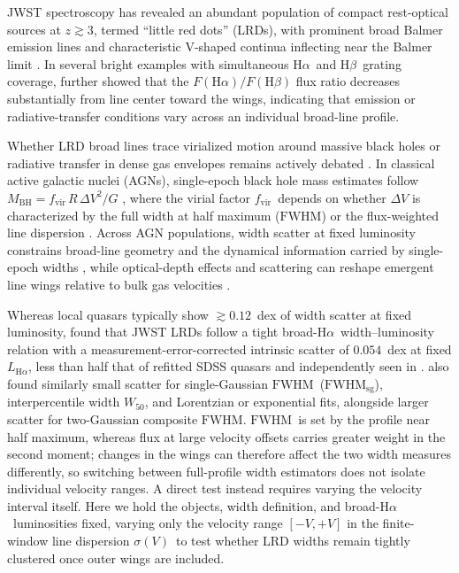\documentclass[twocolumn]{aastex631}
\newcommand{\Ha}{\ensuremath{\mathrm{H}\alpha}}
\newcommand{\Hb}{\ensuremath{\mathrm{H}\beta}}
\newcommand{\LHa}{\ensuremath{L_{\mathrm{H}\alpha}}}
\newcommand{\FWHM}{\ensuremath{\mathrm{FWHM}}}
\newcommand{\FWHMsg}{\ensuremath{\mathrm{FWHM}_{\mathrm{sg}}}}
\newcommand{\fvir}{\ensuremath{f_{\mathrm{vir}}}}
\newcommand{\MBH}{\ensuremath{M_{\mathrm{BH}}}}
\newcommand{\sigV}{\ensuremath{\sigma(V)}}
\begin{document}
JWST spectroscopy has revealed an abundant population of compact rest-optical sources at $z \gtrsim 3$, termed ``little red dots'' (LRDs), with prominent broad Balmer emission lines \citep{Matthee2024,Greene2024} and characteristic V-shaped continua inflecting near the Balmer limit \citep{Setton2025Vshape}. In several bright examples with simultaneous \Ha\ and \Hb\ grating coverage, \citet[][Section~V.3.1 and Figure~9]{Chen2026} further showed that the $F(\Ha)/F(\Hb)$ flux ratio decreases substantially from line center toward the wings, indicating that emission or radiative-transfer conditions vary across an individual broad-line profile.

Whether LRD broad lines trace virialized motion around massive black holes or radiative transfer in dense gas envelopes remains actively debated \citep[e.g.,][]{Rusakov2026,Madau2026b,InayoshiHo}. In classical active galactic nuclei (AGNs), single-epoch black hole mass estimates follow $\MBH = \fvir\, R\, \Delta V^2 / G$ \citep{Peterson2004,GreeneHo2005,Bentz2013}, where the virial factor \fvir\ depends on whether $\Delta V$ is characterized by the full width at half maximum (\FWHM) or the flux-weighted line dispersion \citep{Collin2006}. Across AGN populations, width scatter at fixed luminosity constrains broad-line geometry and the dynamical information carried by single-epoch widths \citep{Fine2008,Croom2011,Assef2012}, while optical-depth effects and scattering can reshape emergent line wings relative to bulk gas velocities \citep{OsterbrockFerland2006,Laor2006}.

Whereas local quasars typically show $\gtrsim 0.12$~dex of width scatter at fixed luminosity, \citet{Wang2026} found that JWST LRDs follow a tight broad-\Ha\ width--luminosity relation with a measurement-error-corrected intrinsic scatter of $0.054$~dex at fixed \LHa, less than half that of refitted SDSS quasars and independently seen in \citet{BaccusXu2026}. \citet{Wang2026} also found similarly small scatter for single-Gaussian \FWHM\ (\FWHMsg), interpercentile width $W_{50}$, and Lorentzian or exponential fits, alongside larger scatter for two-Gaussian composite \FWHM. \FWHM\ is set by the profile near half maximum, whereas flux at large velocity offsets carries greater weight in the second moment; changes in the wings can therefore affect the two width measures differently, so switching between full-profile width estimators does not isolate individual velocity ranges. A direct test instead requires varying the velocity interval itself. Here we hold the objects, width definition, and broad-\Ha\ luminosities fixed, varying only the velocity range $[-V, +V]$ in the finite-window line dispersion \sigV\ to test whether LRD widths remain tightly clustered once outer wings are included.
\end{document}
